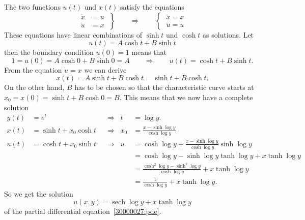 \begin{loesung}
The two functions $u(t)$ und $x(t)$ satisfy the equations
\begin{equation}
\left.
\begin{aligned}
\dot{x} &= u \\
\dot{u} &= x
\end{aligned}
\;
\right\}
\qquad\Rightarrow\qquad
\left\{\;
\begin{aligned}
\ddot{x}=x\\
\ddot{u}=u
\end{aligned}
\right.
\label{30000027:chardgl}
\end{equation}
These equations have linear combinations of $\sinh t$ und $\cosh t$
as solutions.
Let
\[
u(t) = A\cosh t + B\sinh t
\]
then the boundary condition $u(0)=1$ means that 
\[
1 = u(0) = A\cosh 0 + B\sinh 0 = A
\qquad\Rightarrow\qquad
u(t) = \cosh t +B\sinh t.
\]
From the equation $\dot{u}=x$ we can derive
\[
x(t) = A\sinh t + B\cosh t = \sinh t + B\cosh t.
\]
On the other hand, $B$ has to be chosen so that the characteristic
curve starts at $x_0 = x(0) = \sinh t + B\cosh 0 = B$.
This means that we now have a complete solution 
\begin{align*}
y(t) &= e^t                      &&\Rightarrow&    t &= \log y\bigg.\\
x(t) &= \sinh t + x_0\cosh t &&\Rightarrow&
 x_0 &= \frac{x-\sinh\log y}{\cosh\log y}\\
u(t) &= \cosh t + x_0\sinh t &&\Rightarrow&
   u &= \cosh\log y + \frac{x-\sinh\log y}{\cosh\log y}\sinh\log y
\\
     &                           &&           &
     &= \cosh\log y - \sinh\log y\tanh\log y + x\tanh\log y
\\
     &                           &&           &
     &= \frac{\cosh^2\log y - \sinh^2\log y}{\cosh\log y}+x\tanh\log y
\\
     &                           &&           &
     &= \frac{1}{\cosh\log y} + x \tanh\log y.
\end{align*}
So we get the solution
\[
u(x,y) = \operatorname{sech}\log y + x \tanh\log y
\]
of the partial differential equation~\eqref{30000027:pde}.


\end{loesung}
